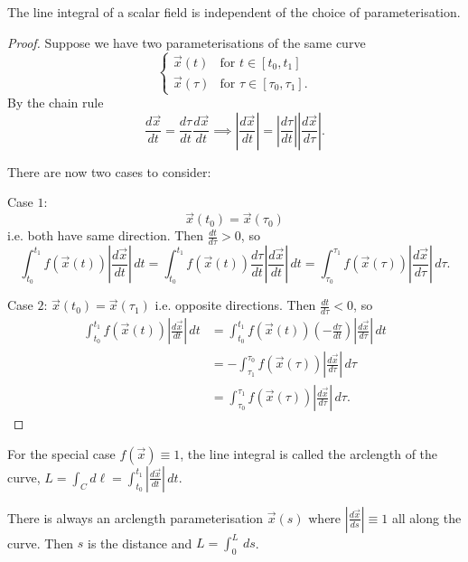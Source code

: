 \documentclass[10pt, a4paper]{article}
\begin{document}
\begin{proposition}
    The line integral of a scalar field is independent of the choice of parameterisation.

    \begin{proof}
        Suppose we have two parameterisations of the same curve
        \[
        \begin{cases}
            \vec{x}(t) &\text{for } t \in [t_0, t_1] \\
            \vec{x}(\tau) &\text{for } \tau \in [\tau_0, \tau_1].
        \end{cases}
        \]
        By the chain rule
        \[
        \frac{d\vec{x}}{dt} = \frac{d\tau}{dt}\frac{d\vec{x}}{dt} \implies \left|\frac{d\vec{x}}{dt}\right| = \left|\frac{d\tau}{dt}\right|\left|\frac{d\vec{x}}{d\tau}\right|.
        \]

        There are now two cases to consider:

        Case $1$:
        \[
        \vec{x}(t_0) = \vec{x}(\tau_0)
        \]
        i.e. both have same direction.
        Then $\frac{dt}{d\tau} > 0$,
        so
        \[
        \int_{t_0}^{t_1}f(\vec{x}(t))\left|\frac{d\vec{x}}{dt}\right|\,dt = \int_{t_0}^{t_1}f(\vec{x}(t))\frac{d\tau}{dt}\left|\frac{d\vec{x}}{dt}\right|\,dt = \int_{\tau_0}^{\tau_1}f(\vec{x}(\tau))\left|\frac{d\vec{x}}{d\tau}\right|\,d\tau.
        \]
        
        Case $2$:
        $\vec{x}(t_0) = \vec{x}(\tau_1)$ i.e. opposite directions.
        Then $\frac{dt}{d\tau} < 0$,
        so
        \begin{align*}
            \int_{t_0}^{t_1}f(\vec{x}(t))\left|\frac{d\vec{x}}{dt}\right|\,dt &= \int_{t_0}^{t_1}f(\vec{x}(t))\left(-\frac{d\tau}{dt}\right)\left|\frac{d\vec{x}}{d\tau}\right|\,dt \\
            &= -\int_{\tau_1}^{\tau_0}f(\vec{x}(\tau))\left|\frac{d\vec{x}}{d\tau}\right|\,d\tau \\
            &= \int_{\tau_0}^{\tau_1}f(\vec{x}(\tau))\left|\frac{d\vec{x}}{d\tau}\right|\,d\tau.
        \end{align*}
    \end{proof}
\end{proposition}

For the special case $f(\vec{x}) \equiv 1$,
the line integral is called the arclength of the curve,
$L = \int_{C}d\ell = \int_{t_0}^{t_1}\left|\frac{d\vec{x}}{dt}\right|\,dt$.

\begin{remark}
    There is always an arclength parameterisation $\vec{x}(s)$ where $\left|\frac{d\vec{x}}{ds}\right| \equiv 1$ all along the curve.
    Then $s$ is the distance and $L = \int_{0}^{L}\,ds$.
\end{remark}
\end{document}

